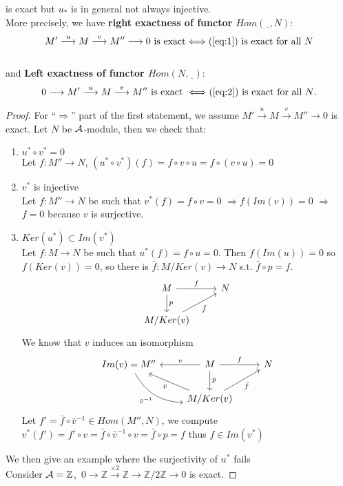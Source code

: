 \documentclass[11pt]{article}
\newcommand{\intg}{\mathbb Z}
\newcommand{\cala}{{\cal A}}
\newcommand{\Lrta}{\Longrightarrow}
\newcommand{\lrta}{\longrightarrow}
\begin{document}
is exact but $u_*$ is in general not always injective.
\\
More precisely, we have \textbf{right exactness of functor $Hom(\underline{\ \ }, N)$}:\\
$$
M'\overset{u}{\lrta}M\overset{v}{\lrta}M'' \lrta0 \text{ is exact} \Longleftrightarrow (\ref{eq:1}) \text{ is exact for all $N$}
$$\\
and 
\textbf{Left exactness of functor $Hom(N,\underline{\ \ })$}:\\
$$
0\lrta M'\overset{u}{\lrta}M\overset{v}{\lrta}M'' \text{ is exact }\Longleftrightarrow (\ref{eq:2})\text{ is exact for all $N$}.
$$
\begin{proof}
For ``$\Lrta$'' part of the first statement, we assume $M'\overset{u}{\lrta}M\overset{v}{\lrta}M'' \lrta0$ is exact. 
Let $N$ be $\cala$-module, then we check that:
\begin{enumerate}
\item $u^*\circ v^*=0$\\
Let $f:M''\lrta N$, $(u^*\circ v^*)(f)=f\circ v\circ u=f\circ(v\circ u)=0$ 
\item $v^*$ is injective\\
Let $f:M''\lrta N$ be such that $v^*(f)=f\circ v=0$ $\Lrta f(Im(v))=0$ $\Lrta$ $f=0$ because $v$ is surjective.
\item $Ker(u^*)\subset Im(v^*)$\\
Let $f:M\lrta N$ be such that $u^*(f)=f\circ u=0$. Then $f(Im(u))=0$ so $f(Ker(v))=0$, so there is $\bar{f}:M/Ker(v)\lrta N$ s.t. $\bar{f}\circ p=f$.
\[
\begin{tikzcd}
 M  \arrow[r,"f"] \arrow[d,"p"] & N \\
M/Ker(v)\arrow[swap, ur,"\bar{f}"] &    
\end{tikzcd}
\]
We know that $v$ induces an isomorphism 
\[
\begin{tikzcd}
 Im(v)=M''\arrow[dr,swap,bend right,"\bar{v}^{-1}"]&
 M \arrow[swap,l,"v"] \arrow[r,"f"]  \arrow[d,"p"] & N \\
& M/Ker(v)\arrow[swap, ur,"\bar{f}"] \arrow[ul,"\bar{v}"]& 
\end{tikzcd}
\]
Let $f'=\bar{f}\circ \bar{v}^{-1}\in Hom(M'',N)$, we compute $v^*(f')=f'\circ v=\bar{f}\circ \bar{v}^{-1}\circ v=\bar{f}\circ p=f$ thus $f\in Im(v^*)$
\end{enumerate} 
We then give an example where the surjectivity of $u^*$ fails\\
Consider $\cala=\intg$,\ 
$0\lrta \intg\overset{\times 2}{\lrta}\intg\overset{\ }{\lrta}\intg/2\intg \lrta0$ is exact.

\end{proof}
\end{document}
